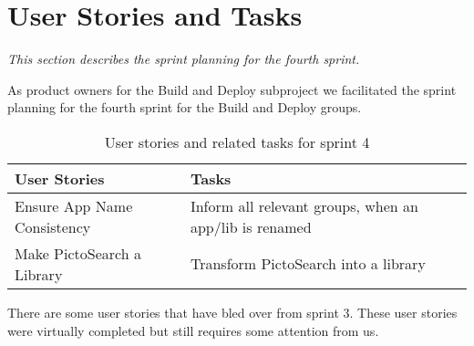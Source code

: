 \section{User Stories and Tasks} \label{Sprint4_SecUserStoriesAndTasks}
\textit{This section describes the sprint planning for the fourth sprint.}

As product owners for the Build and Deploy subproject we facilitated the sprint planning for the fourth sprint for the Build and Deploy groups.

\begin{table}
	\centering
	\begin{tabular}{ll}
		\textbf{User Stories} & \textbf{Tasks}\\ \hline \noalign{\vskip 2mm}
		Ensure App Name Consistency & Inform all relevant groups, when an app/lib is renamed\\ \hline
		Make PictoSearch a Library & Transform PictoSearch into a library \\ \hline
	\end{tabular}
	\caption{User stories and related tasks for sprint 4}
	\label{Sprint4_UserStories4_table}
\end{table}

There are some user stories that have bled over from sprint 3. These user stories were virtually completed but still requires some attention from us.\\
